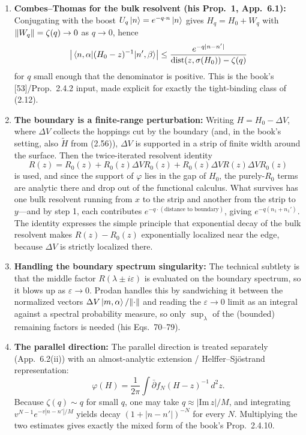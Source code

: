 \begin{enumerate}
    \item \textbf{Combes--Thomas for the bulk resolvent (his Prop.~1, App.~6.1):} 
    Conjugating with the boost $U_q \ket{n} = e^{-q \cdot n}\ket{n}$ gives $H_q = H_0 + W_q$ with $\norm{W_q} = \zeta(q) \to 0$ as $q \to 0$, hence
    \[
        \abs{\matrixel{n,\alpha}{(H_0-z)^{-1}}{n',\beta}} \le \frac{e^{-q|n-n'|}}{\dist(z,\sigma(H_0)) - \zeta(q)}
    \]
    for $q$ small enough that the denominator is positive. This is the book's [53]/Prop.~2.4.2 input, made explicit for exactly the tight-binding class of (2.12).

    \item \textbf{The boundary is a finite-range perturbation:} 
    Writing $H = H_0 - \Delta V$, where $\Delta V$ collects the hoppings cut by the boundary (and, in the book's setting, also $\tilde{H}$ from (2.56)), $\Delta V$ is supported in a strip of finite width around the surface. Then the twice-iterated resolvent identity 
    \[
        R(z) = R_0(z) + R_0(z)\Delta V R_0(z) + R_0(z)\Delta V R(z)\Delta V R_0(z)
    \]
    is used, and since the support of $\varphi$ lies in the gap of $H_0$, the purely-$R_0$ terms are analytic there and drop out of the functional calculus. What survives has one bulk resolvent running from $x$ to the strip and another from the strip to $y$---and by step 1, each contributes $e^{-q \cdot (\text{distance to boundary})}$, giving $e^{-q(n_1+n_1')}$. The identity expresses the simple principle that exponential decay of the bulk resolvent makes $R(z) - R_0(z)$ exponentially localized near the edge, because $\Delta V$ is strictly localized there.

    \item \textbf{Handling the boundary spectrum singularity:} 
    The technical subtlety is that the middle factor $R(\lambda \pm i\varepsilon)$ is evaluated on the boundary spectrum, so it blows up as $\varepsilon \to 0$. Prodan handles this by sandwiching it between the normalized vectors $\Delta V\ket{m,\alpha}/\norm{\cdot}$ and reading the $\varepsilon \to 0$ limit as an integral against a spectral probability measure, so only $\sup_\lambda$ of the (bounded) remaining factors is needed (his Eqs.~70--79).

    \item \textbf{The parallel direction:} 
    The parallel direction is treated separately (App.~6.2(ii)) with an almost-analytic extension / Helffer--Sjöstrand representation:
    \[
        \varphi(H) = \frac{1}{2\pi}\int \bar{\partial}f_N (H-z)^{-1} \, d^2z.
    \]
    Because $\zeta(q) \sim q$ for small $q$, one may take $q \approx |\mathrm{Im}\, z|/M$, and integrating $v^{N-1}e^{-v|n-n'|/M}$ yields decay $(1+|n-n'|)^{-N}$ for every $N$. Multiplying the two estimates gives exactly the mixed form of the book's Prop.~2.4.10.
\end{enumerate}

